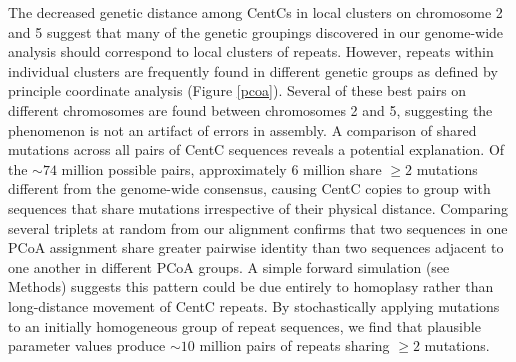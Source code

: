 The decreased genetic distance among CentCs in local clusters on chromosome 2 and 5 suggest that many of the genetic groupings discovered in our genome-wide analysis should correspond to local clusters of repeats. 
However, repeats within individual clusters are frequently found in different genetic groups as defined by principle coordinate analysis (Figure \ref{pcoa}).
Several of these best pairs on different chromosomes are found between chromosomes 2 and 5, suggesting the phenomenon is not an artifact of errors in assembly.
A comparison of shared mutations across all pairs of CentC sequences reveals a potential explanation.  
Of the $\sim 74$ million possible pairs,  approximately 6 million share $\geq 2$ mutations different from the genome-wide consensus, causing CentC copies to group with sequences that share mutations irrespective of their physical distance.  
Comparing several triplets at random from our alignment confirms that two sequences in one PCoA assignment share greater pairwise identity than two sequences adjacent to one another in different PCoA groups.  
A simple forward simulation (see Methods) suggests this pattern could be due entirely to homoplasy rather than long-distance movement of CentC repeats.  
By stochastically applying mutations to an initially homogeneous group of repeat sequences, we find that plausible parameter values produce $\sim 10$ million pairs of repeats sharing $\geq 2$ mutations.

